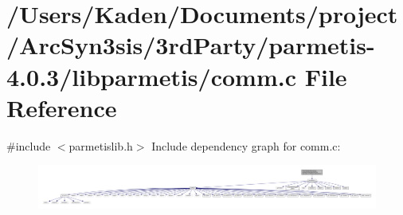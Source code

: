 \hypertarget{a00344}{}\section{/\+Users/\+Kaden/\+Documents/project/\+Arc\+Syn3sis/3rd\+Party/parmetis-\/4.0.3/libparmetis/comm.c File Reference}
\label{a00344}
{\ttfamily \#include $<$parmetislib.\+h$>$}\newline
Include dependency graph for comm.\+c\+:\nopagebreak
\begin{figure}[H]
\begin{center}
\leavevmode
\includegraphics[width=350pt]{a00345}
\end{center}
\end{figure}

